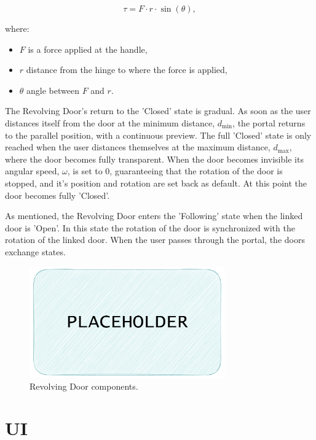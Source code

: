 \[
\tau = F \cdot r \cdot \sin(\theta),
\]

where:
\begin{itemize}
  \item \(F\) is a force applied at the handle,
  \item \(r\) distance from the hinge to where the force is applied,
  \item $\theta$ angle between \(F\) and \(r\).
\end{itemize}

The Revolving Door's return to the 'Closed' state is gradual. As soon as the user distances itself from the door at the minimum distance, $d_{\min}$,
the portal returns to the parallel position, with a continuous preview. The full 'Closed' state is only reached when the user distances themselves 
at the maximum distance, $d_{\max}$, where the door becomes fully transparent. When the door becomes invisible its angular speed, $\omega$,
is set to 0, guaranteeing that the rotation of the door is stopped, and it's position and rotation are set back as default. At this point the door 
becomes fully 'Closed'.

As mentioned, the Revolving Door enters the 'Following' state when the linked door is 'Open'. In this state the rotation of the door is synchronized
with the rotation of the linked door. When the user passes through the portal, the doors exchange states.

\begin{figure}[t]
    \centering
     \includegraphics[width=0.75\textwidth]{NOVAthesisFiles/Images/placeholder.pdf}
     \caption[Revolving Door components.]
     {Revolving Door components.}
     \label{fig:rev-door-comp}
\end{figure}

\section{UI}
\label{sec:ui}

